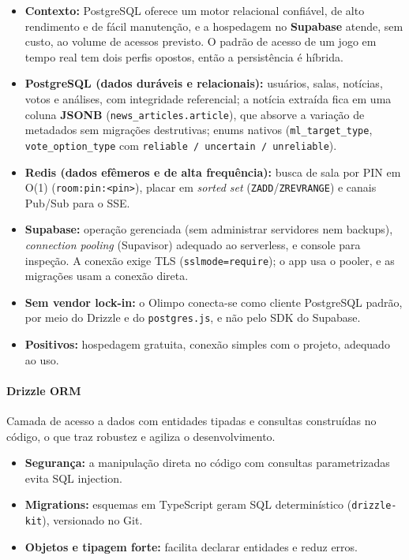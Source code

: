 \documentclass[
  brazilian,
  11pt,
]{article}
\providecommand{\tightlist}{%
  \setlength{\itemsep}{0pt}\setlength{\parskip}{0pt}}
\begin{document}
\begin{itemize}
\tightlist
\item
  \textbf{Contexto:} PostgreSQL oferece um motor relacional confiável, de alto rendimento e de fácil manutenção, e a hospedagem no \textbf{Supabase} atende, sem custo, ao volume de acessos previsto. O padrão de acesso de um jogo em tempo real tem dois perfis opostos, então a persistência é híbrida.
\item
  \textbf{PostgreSQL (dados duráveis e relacionais):} usuários, salas, notícias, votos e análises, com integridade referencial; a notícia extraída fica em uma coluna \textbf{JSONB} (\texttt{news\_articles.article}), que absorve a variação de metadados sem migrações destrutivas; enums nativos (\texttt{ml\_target\_type}, \texttt{vote\_option\_type} com \texttt{reliable\ /\ uncertain\ /\ unreliable}).
\item
  \textbf{Redis (dados efêmeros e de alta frequência):} busca de sala por PIN em O(1) (\texttt{room:pin:\textless{}pin\textgreater{}}), placar em \emph{sorted set} (\texttt{ZADD}/\texttt{ZREVRANGE}) e canais Pub/Sub para o SSE.
\item
  \textbf{Supabase:} operação gerenciada (sem administrar servidores nem backups), \emph{connection pooling} (Supavisor) adequado ao serverless, e console para inspeção. A conexão exige TLS (\texttt{sslmode=require}); o app usa o pooler, e as migrações usam a conexão direta.
\item
  \textbf{Sem vendor lock-in:} o Olimpo conecta-se como cliente PostgreSQL padrão, por meio do Drizzle e do \texttt{postgres.js}, e não pelo SDK do Supabase.
\item
  \textbf{Positivos:} hospedagem gratuita, conexão simples com o projeto, adequado ao uso.
\end{itemize}

\paragraph{Drizzle ORM}\label{drizzle-orm}

Camada de acesso a dados com entidades tipadas e consultas construídas no código, o que traz robustez e agiliza o desenvolvimento.

\begin{itemize}
\tightlist
\item
  \textbf{Segurança:} a manipulação direta no código com consultas parametrizadas evita SQL injection.
\item
  \textbf{Migrations:} esquemas em TypeScript geram SQL determinístico (\texttt{drizzle-kit}), versionado no Git.
\item
  \textbf{Objetos e tipagem forte:} facilita declarar entidades e reduz erros.
\end{itemize}
\end{document}
